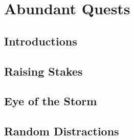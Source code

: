 \documentclass[a4paper,openany]{book}
\begin{document}
%



\printglossary[
  type=symbols,
  ]

\printglossary[
  style=mcolindexspannav,
]

\mainmatter




\clearpage


\chapter{Abundant Quests}

\section{Introductions}
\begin{multicols}{2}
\ifodd\value{temperature}
  
\fi
%

%
\ifodd\value{temperature}
\else
  
\fi
\end{multicols}

\section{Raising Stakes}
\begin{multicols}{2}


\end{multicols}

\section{Eye of the Storm}

\begin{multicols}{2}


\end{multicols}

\section{Random Distractions}


\begin{multicols}{2}


\end{multicols}
\end{document}
